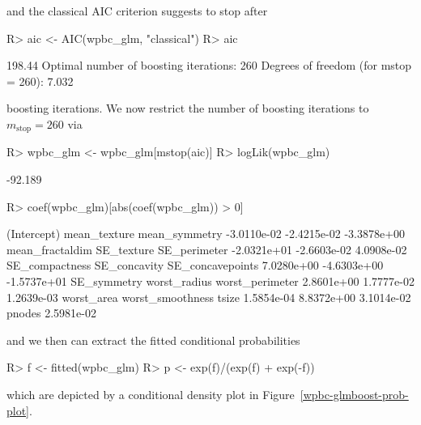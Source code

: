 \documentclass{article}
\newcommand{\Robject}[1]{\texttt{#1}}
\newenvironment{Schunk}{}{}
\begin{document}
and the classical AIC criterion suggests to stop after
\begin{Schunk}
\begin{Sinput}
R> aic <- AIC(wpbc_glm, "classical")
R> aic
\end{Sinput}
\begin{Soutput}
[1] 198.44
Optimal number of boosting iterations: 260 
Degrees of freedom (for mstop = 260): 7.032 
\end{Soutput}
\end{Schunk}
boosting iterations. 
We now restrict the number of boosting iterations to 
$m_\text{stop} = 260$ via
\begin{Schunk}
\begin{Sinput}
R> wpbc_glm <- wpbc_glm[mstop(aic)]
R> logLik(wpbc_glm)
\end{Sinput}
\begin{Soutput}
[1] -92.189
\end{Soutput}
\begin{Sinput}
R> coef(wpbc_glm)[abs(coef(wpbc_glm)) > 0]
\end{Sinput}
\begin{Soutput}
     (Intercept)     mean_texture    mean_symmetry 
     -3.0110e-02      -2.4215e-02      -3.3878e+00 
 mean_fractaldim       SE_texture     SE_perimeter 
     -2.0321e+01      -2.6603e-02       4.0908e-02 
  SE_compactness     SE_concavity SE_concavepoints 
      7.0280e+00      -4.6303e+00      -1.5737e+01 
     SE_symmetry     worst_radius  worst_perimeter 
      2.8601e+00       1.7777e-02       1.2639e-03 
      worst_area worst_smoothness            tsize 
      1.5854e-04       8.8372e+00       3.1014e-02 
          pnodes 
      2.5981e-02 
\end{Soutput}
\end{Schunk}
and we then can extract the fitted conditional probabilities 
\begin{Schunk}
\begin{Sinput}
R> f <- fitted(wpbc_glm)
R> p <- exp(f)/(exp(f) + exp(-f))
\end{Sinput}
\end{Schunk}
which are depicted by a conditional density plot in 
Figure~\ref{wpbc-glmboost-prob-plot}.
\end{document}
